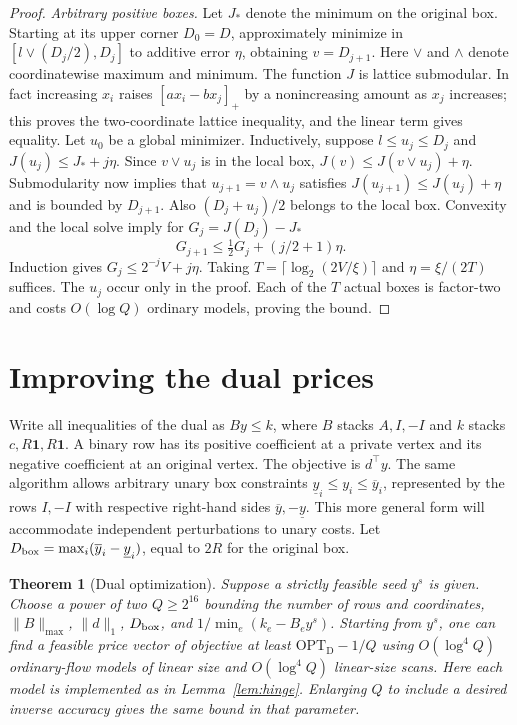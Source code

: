 \documentclass[11pt,letterpaper]{article}
\newtheorem{theorem}{Theorem}[section]
\begin{document}
\begin{proof}
\emph{Arbitrary positive boxes.}
Let $J_*$ denote the minimum on the original box. Starting at its upper
corner $D_0=D$, approximately minimize in
$[l\vee(D_j/2),D_j]$ to additive error $\eta$, obtaining $v=D_{j+1}$.
Here $\vee$ and $\wedge$ denote coordinatewise maximum and minimum.
The function $J$ is lattice submodular. In fact increasing $x_i$ raises
$[a x_i-b x_j]_+$ by a nonincreasing amount as $x_j$ increases; this
proves the two-coordinate lattice inequality, and the linear term gives
equality. Let $u_0$ be a global minimizer. Inductively, suppose
$l\le u_j\le D_j$ and $J(u_j)\le J_*+j\eta$. Since $v\vee u_j$ is in
the local box, $J(v)\le J(v\vee u_j)+\eta$. Submodularity now implies
that $u_{j+1}=v\wedge u_j$ satisfies $J(u_{j+1})\le J(u_j)+\eta$
and is bounded by $D_{j+1}$. Also $(D_j+u_j)/2$ belongs to the local
box. Convexity and the local solve imply for $G_j=J(D_j)-J_*$
\[
 G_{j+1}\le \tfrac12G_j+(j/2+1)\eta .
\]
Induction gives $G_j\le2^{-j}V+j\eta$. Taking
$T=\lceil\log_2(2V/\xi)\rceil$ and $\eta=\xi/(2T)$ suffices.
The $u_j$ occur only in the proof. Each of the $T$ actual boxes is
factor-two and costs $O(\log Q)$ ordinary models, proving the bound.
\end{proof}
\section{Improving the dual prices}
\label{sec:dual-improve}

Write all inequalities of the dual as $By\le k$, where $B$ stacks $A,I,-I$ and $k$ stacks $c,R\mathbf1,R\mathbf1$. A binary row has its positive coefficient at a private vertex and its negative coefficient at an original vertex. The objective is $d^\top y$. The same algorithm allows arbitrary unary box constraints $\underline y_i\le y_i\le\overline y_i$, represented by the rows $I,-I$ with respective right-hand sides $\overline y,-\underline y$. This more general form will accommodate independent perturbations to unary costs. Let $D_{\rm box}=\max_i(\overline y_i-\underline y_i)$, equal to $2R$ for the original box.

\begin{theorem}[Dual optimization]\label{thm:dual}
Suppose a strictly feasible seed $y^s$ is given. Choose a power of two $Q\ge 2^{16}$ bounding the number of rows and coordinates, $\|B\|_{\max}$, $\|d\|_1$, $D_{\rm box}$, and $1/\min_e(k_e-B_e y^s)$. Starting from $y^s$, one can find a feasible price vector of objective at least $\mathrm{OPT}_{\mathrm D}-1/Q$ using $O(\log^4 Q)$ ordinary-flow models of linear size and $O(\log^4 Q)$ linear-size scans. Here each model is implemented as in Lemma~\ref{lem:hinge}. Enlarging $Q$ to include a desired inverse accuracy gives the same bound in that parameter.
\end{theorem}
\end{document}
